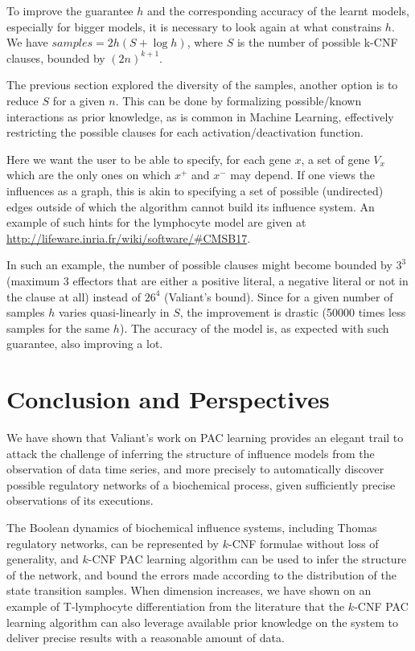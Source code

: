 \documentclass{llncs}
\begin{document}
To improve the guarantee $h$ and the corresponding accuracy of the learnt
models, especially for bigger models, it is necessary to look again at what
constrains $h$. We have \(samples = 2h(S + \log h)\), where $S$ is the number
of possible k-CNF clauses, bounded by $(2n)^{k+1}$.

The previous section explored the diversity of the samples, another option is
to reduce $S$ for a given $n$. This can be done by formalizing possible/known
interactions as prior knowledge, as is common in Machine Learning, effectively
restricting the possible clauses for each activation/deactivation function.

Here we want the user to be able to specify, for each gene $x$, a set of gene
$V_x$ which are the only ones on which $x^+$ and $x^-$ may depend. If one
views the influences as a graph, this is akin to specifying a set of possible
(undirected) edges outside of which the algorithm cannot build its influence
system. An example of such hints for the lymphocyte model are given at
\url{http://lifeware.inria.fr/wiki/software/\#CMSB17}.

In such an example, the number of possible clauses might become bounded by
$3^3$ (maximum 3 effectors that are either a positive literal, a negative
literal or not in the clause at all) instead of $26^4$ (Valiant's bound).
Since for a given number of samples $h$ varies quasi-linearly in $S$, the
improvement is drastic (50000 times less samples for the same $h$). The
accuracy of the model is, as expected with such guarantee, also improving a
lot.

\section{Conclusion and Perspectives}

We have shown that Valiant's work on PAC learning provides an elegant trail 
to attack the challenge of inferring the structure of influence models from the observation of data time series,
and more precisely to automatically discover possible regulatory networks of a biochemical process, given sufficiently precise observations of its executions.

The Boolean dynamics of biochemical influence systems, including Thomas regulatory networks, can be represented by $k$-CNF formulae without loss of generality,
and $k$-CNF PAC learning algorithm can be used to infer the structure of the network,
and bound the errors made according to the distribution of the state transition samples.
When dimension increases, we have shown on an example of T-lymphocyte differentiation from the literature
that the $k$-CNF PAC learning algorithm can also leverage available
prior knowledge on the system to deliver precise results with a reasonable
amount of data.
\end{document}
